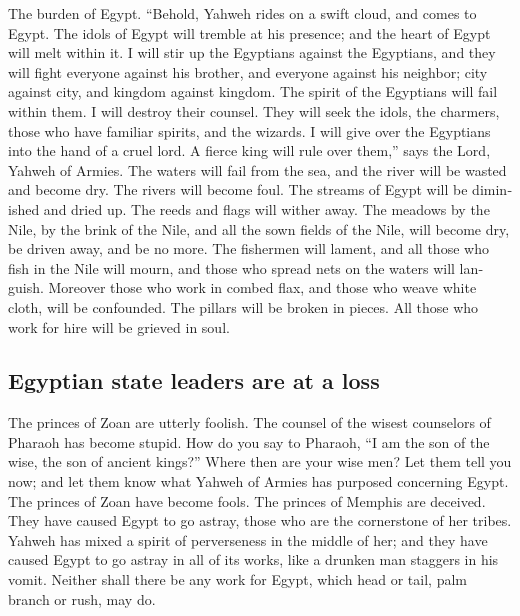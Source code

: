 \begin{paracol}{2}
\begin{otherlanguage}{english}
 The burden of Egypt. ``Behold, Yahweh rides on a swift
cloud, and comes to Egypt. The idols of Egypt will tremble at his
presence; and the heart of Egypt will melt within it.  I
will stir up the Egyptians against the Egyptians, and they will fight
everyone against his brother, and everyone against his neighbor; city
against city, and kingdom against kingdom.  The spirit of
the Egyptians will fail within them. I will destroy their counsel. They
will seek the idols, the charmers, those who have familiar spirits, and
the wizards.  I will give over the Egyptians into the hand
of a cruel lord. A fierce king will rule over them,'' says the Lord,
Yahweh of Armies.  The waters will fail from the sea, and
the river will be wasted and become dry.  The rivers will
become foul. The streams of Egypt will be diminished and dried up. The
reeds and flags will wither away.  The meadows by the
Nile, by the brink of the Nile, and all the sown fields of the Nile,
will become dry, be driven away, and be no more.  The
fishermen will lament, and all those who fish in the Nile will mourn,
and those who spread nets on the waters will languish. 
Moreover those who work in combed flax, and those who weave white cloth,
will be confounded.  The pillars will be broken in
pieces. All those who work for hire will be grieved in soul.

\hypertarget{egyptian-state-leaders-are-at-a-loss}{%
\subsection{Egyptian state leaders are at a
loss}\label{egyptian-state-leaders-are-at-a-loss}}

 The princes of Zoan are utterly foolish. The counsel of
the wisest counselors of Pharaoh has become stupid. How do you say to
Pharaoh, ``I am the son of the wise, the son of ancient kings?''
 Where then are your wise men? Let them tell you now; and
let them know what Yahweh of Armies has purposed concerning Egypt.
 The princes of Zoan have become fools. The princes of
Memphis are deceived. They have caused Egypt to go astray, those who are
the cornerstone of her tribes.  Yahweh has mixed a spirit
of perverseness in the middle of her; and they have caused Egypt to go
astray in all of its works, like a drunken man staggers in his vomit.
 Neither shall there be any work for Egypt, which head or
tail, palm branch or rush, may do.


\end{otherlanguage}
\end{paracol}
